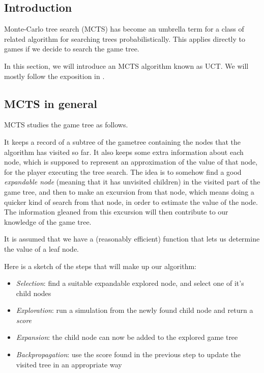 \subsection {Introduction}


Monte-Carlo tree search (MCTS) has become an umbrella term for a class of related algorithm for searching trees probabilistically.
This applies directly to games if we decide to search the game tree.

In this section, we will introduce an MCTS algorithm known as UCT.
We will mostly follow the exposition in \citep{mcts_survey12}.

\subsection {MCTS in general}

MCTS studies the game tree as follows.

It keeps a record of a subtree of the gametree containing the nodes that the algorithm has visited so far.
It also keeps some extra information about each node, which is supposed to represent an approximation of the value of that node, for the player executing the tree search.
The idea is to somehow find a good \emph{expandable node} (meaning that it has unvisited children) in the visited part of the game tree, and then to make an excursion from that node, which means doing a quicker kind of search from that node, in order to estimate the value of the node. The information gleaned from this excursion will then contribute to our knowledge of the game tree.

It is assumed that we have a (reasonably efficient) function that lets us determine the value of a leaf node.

Here is a sketch of the steps that will make up our algorithm:

\begin{itemize}
\item \emph{Selection}: find a suitable expandable explored node, and select one of it's child nodes
\item \emph{Exploration}: run a simulation from the newly found child node and return a \emph{score}
\item \emph{Expansion}: the child node can now be added to the explored game tree
\item \emph{Backpropagation}: use the score found in the previous step to update the visited tree in an appropriate way
\end{itemize}

